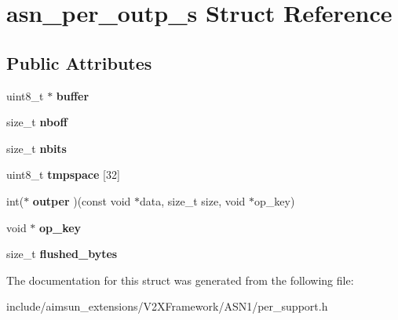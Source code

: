 \hypertarget{structasn__per__outp__s}{}\section{asn\+\_\+per\+\_\+outp\+\_\+s Struct Reference}
\label{structasn__per__outp__s}
\subsection*{Public Attributes}
\begin{DoxyCompactItemize}
\item 
uint8\+\_\+t $\ast$ {\bfseries buffer}\hypertarget{structasn__per__outp__s_a48c9ceaafe41b549652f25922c1e0d61}{}\label{structasn__per__outp__s_a48c9ceaafe41b549652f25922c1e0d61}

\item 
size\+\_\+t {\bfseries nboff}\hypertarget{structasn__per__outp__s_a414cbcccffad5a86b0d51166cc1eb94d}{}\label{structasn__per__outp__s_a414cbcccffad5a86b0d51166cc1eb94d}

\item 
size\+\_\+t {\bfseries nbits}\hypertarget{structasn__per__outp__s_a0d23210c600b088d271ee475c83da9ba}{}\label{structasn__per__outp__s_a0d23210c600b088d271ee475c83da9ba}

\item 
uint8\+\_\+t {\bfseries tmpspace} \mbox{[}32\mbox{]}\hypertarget{structasn__per__outp__s_ac13d0f08ae74c6f48d6706bb21d61c18}{}\label{structasn__per__outp__s_ac13d0f08ae74c6f48d6706bb21d61c18}

\item 
int($\ast$ {\bfseries outper} )(const void $\ast$data, size\+\_\+t size, void $\ast$op\+\_\+key)\hypertarget{structasn__per__outp__s_afaa9fd277b0ca190698086b4d42395ea}{}\label{structasn__per__outp__s_afaa9fd277b0ca190698086b4d42395ea}

\item 
void $\ast$ {\bfseries op\+\_\+key}\hypertarget{structasn__per__outp__s_ae5804721478d885d76994fafd9d8c67e}{}\label{structasn__per__outp__s_ae5804721478d885d76994fafd9d8c67e}

\item 
size\+\_\+t {\bfseries flushed\+\_\+bytes}\hypertarget{structasn__per__outp__s_a972e9580e422c7f2bfc576d129adc1ac}{}\label{structasn__per__outp__s_a972e9580e422c7f2bfc576d129adc1ac}

\end{DoxyCompactItemize}


The documentation for this struct was generated from the following file\+:\begin{DoxyCompactItemize}
\item 
include/aimsun\+\_\+extensions/\+V2\+X\+Framework/\+A\+S\+N1/per\+\_\+support.\+h\end{DoxyCompactItemize}
